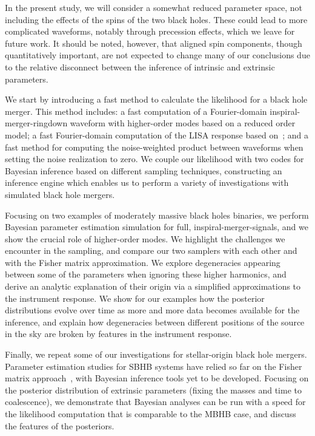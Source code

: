 \documentclass[aps,showpacs,twocolumn,prd,superscriptaddress,nofootinbib]{revtex4-1}
\begin{document}
In the present study, we will consider a somewhat reduced parameter space, not including the effects of the spins of the two black holes. These could lead to more complicated waveforms, notably through precession effects, which we leave for future work. It should be noted, however, that aligned spin components, though quantitatively important, are not expected to change many of our conclusions due to the relative disconnect between the inference of intrinsic and extrinsic parameters.

We start by introducing a fast method to calculate the likelihood for a black hole merger. This method includes: a fast computation of a Fourier-domain inspiral-merger-ringdown waveform with higher-order modes based on a reduced order model; a fast Fourier-domain computation of the LISA response based on~\cite{MB18}; and a fast method for computing the noise-weighted product between waveforms when setting the noise realization to zero. We couple our likelihood with two codes for Bayesian inference based on different sampling techniques, constructing an inference engine which enables us to perform a variety of investigations with simulated black hole mergers.

Focusing on two examples of moderately massive black holes binaries, we perform Bayesian parameter estimation simulation for full, inspiral-merger-signals, and we show the crucial role of higher-order modes. We highlight the challenges we encounter in the sampling, and compare our two samplers with each other and with the Fisher matrix approximation. We explore degeneracies appearing between some of the parameters when ignoring these higher harmonics, and derive an analytic explanation of their origin via a simplified approximations to the instrument response. We show for our examples how the posterior distributions evolve over time as more and more data becomes available for the inference, and explain how degeneracies between different positions of the source in the sky are broken by features in the instrument response.

Finally, we repeat some of our investigations for stellar-origin black hole mergers. Parameter estimation studies for SBHB systems have relied so far on the Fisher matrix approach~\cite{Sesana16, Vitale16, Nishizawa+16a, Nishizawa+16b}, with Bayesian inference tools yet to be developed. Focusing on the posterior distribution of extrinsic parameters (fixing the masses and time to coalescence), we demonstrate that Bayesian analyses can be run with a speed for the likelihood computation that is comparable to the MBHB case, and discuss the features of the posteriors.
\end{document}
